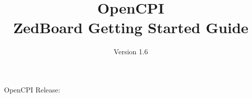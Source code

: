 \iffalse
This file is protected by Copyright. Please refer to the COPYRIGHT file
distributed with this source distribution.

This file is part of OpenCPI <http://www.opencpi.org>

OpenCPI is free software: you can redistribute it and/or modify it under the
terms of the GNU Lesser General Public License as published by the Free Software
Foundation, either version 3 of the License, or (at your option) any later
version.

OpenCPI is distributed in the hope that it will be useful, but WITHOUT ANY
WARRANTY; without even the implied warranty of MERCHANTABILITY or FITNESS FOR A
PARTICULAR PURPOSE. See the GNU Lesser General Public License for more details.

You should have received a copy of the GNU Lesser General Public License along
with this program. If not, see <http://www.gnu.org/licenses/>.
\fi

\def\docTitle{OpenCPI\\ \bigskip ZedBoard Getting Started Guide}
\def\docVersion{1.6}
\def\rccplatform{xilinx13\_3}
\def\radioName{Zedboard}
\def\mountPoint{/mnt/}
\def\copyLoc{<partition>}
\def\snippetpath{../../../../../../doc/av/tex/snippets}



\date{Version \docVersion} %
\title{\docTitle}
\usepackage[T1]{fontenc} %
\usepackage{graphicx}
\graphicspath{ {figures/} }

\maketitle
\begin{center}
OpenCPI Release: \ocpiversion
\end{center}

